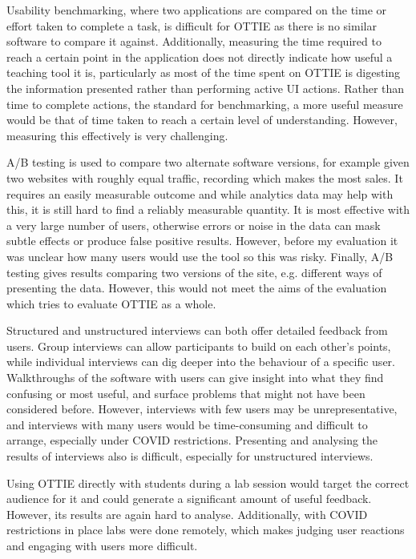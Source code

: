 \documentclass[a4paper,fleqn,oneside,12pt]{report}
\begin{document}
Usability benchmarking, where two applications are compared on the time or effort taken to complete a task, is difficult for OTTIE as there is no similar software to compare it against. Additionally, measuring the time required to reach a certain point in the application does not directly indicate how useful a teaching tool it is, particularly as most of the time spent on OTTIE is digesting the information presented rather than performing active UI actions. Rather than time to complete actions, the standard for benchmarking, a more useful measure would be that of time taken to reach a certain level of understanding. However, measuring this effectively is very challenging.

A/B testing is used to compare two alternate software versions, for example given two websites with roughly equal traffic, recording which makes the most sales. It requires an easily measurable outcome and while analytics data may help with this, it is still hard to find a reliably measurable quantity. It is most effective with a very large number of users, otherwise errors or noise in the data can mask subtle effects or produce false positive results. However, before my evaluation it was unclear how many users would use the tool so this was risky. Finally, A/B testing gives results comparing two versions of the site, e.g. different ways of presenting the data. However, this would not meet the aims of the evaluation which tries to evaluate OTTIE as a whole.

Structured and unstructured interviews can both offer detailed feedback from users. Group interviews can allow participants to build on each other's points, while individual interviews can dig deeper into the behaviour of a specific user. Walkthroughs of the software with users can give insight into what they find confusing or most useful, and surface problems that might not have been considered before. However, interviews with few users may be unrepresentative, and interviews with many users would be time-consuming and difficult to arrange, especially under COVID restrictions. Presenting and analysing the results of interviews also is difficult, especially for unstructured interviews.

Using OTTIE directly with students during a lab session would target the correct audience for it and could generate a significant amount of useful feedback. However, its results are again hard to analyse. Additionally, with COVID restrictions in place labs were done remotely, which makes judging user reactions and engaging with users more difficult.
\end{document}
